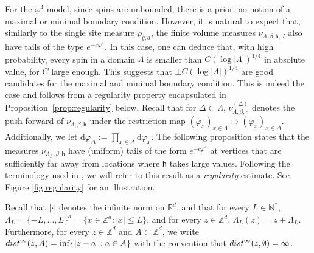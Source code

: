 \documentclass[11pt,a4paper]{article}
\theoremstyle{definition}
\numberwithin{equation}{section}
\begin{document}
For the $\varphi^4$ model, since spins are unbounded, there is a priori no notion of a maximal or minimal boundary condition. However, it is natural to expect that, similarly to the single site measure $\rho_{g,a}$, the finite volume measures $\nu_{\Lambda,\beta,\mathsf{h},J}$ also have tails of the type $e^{-c\varphi^4}$. In this case, one can deduce that, with high probability, every spin in a domain $\Lambda$ is smaller than $C(\log |\Lambda|)^{1/4}$ in absolute value, for $C$ large enough. This suggests that $\pm C(\log |\Lambda|)^{1/4}$ are good candidates for the maximal and minimal boundary condition. This is indeed the case and follows from a regularity property encapsulated in Proposition~\ref{prop:regularity} below. Recall that for $\Delta\subset \Lambda$, $\nu_{\Lambda,\beta,\mathsf{h}}^{(\Delta)}$ denotes the push-forward of $\nu_{\Lambda,\beta,\mathsf{h}}$ under the restriction map $(\varphi_x)_{x\in \Lambda}\mapsto (\varphi_x)_{x\in \Delta}$. Additionally, we let $\mathrm{d}\varphi_\Delta:=\prod_{x\in \Delta}\mathrm{d}\varphi_x$. The following proposition states that the measures $\nu_{\Lambda_L,\beta,\mathsf h}$ have (uniform) tails of the form $e^{-c\varphi^4}$ at vertices that are sufficiently far away from locations where $\mathsf{h}$ takes large values. Following the terminology used in \cite{GunaratnamPanagiotisPanisSeveroPhi42022}, we will refer to this result as a \emph{regularity} estimate. See Figure \ref{fig:regularity} for an illustration.

Recall that $|\cdot|$ denotes the infinite norm on $\mathbb R^d$, and that for every $L \in \mathbb N^*$, $\Lambda_L= \{-L,\dots,L\}^d = \{ x \in \mathbb Z^d : |x|\leq L\}$, and for every $z \in \mathbb Z^d$, $\Lambda_L(z)=z+\Lambda_L$. Furthermore, for every $z \in \mathbb Z^d$ and $A \subset \mathbb Z^d$, we write ${\rm dist}^\infty(z,A)= \inf \{ |z-a| : a \in A \}$ with the convention that ${\rm dist}^\infty(z,\emptyset) = \infty$. 
\end{document}
